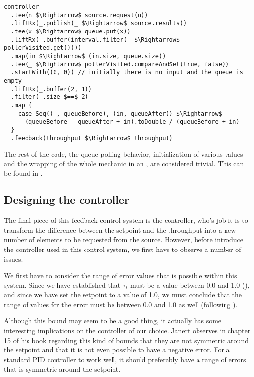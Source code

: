 \begin{minipage}{\linewidth}
\begin{lstlisting}[style=ScalaStyle, caption={Feedback system for controlling the buffer}, label={lst:buffer-feedback-control}]
controller
  .tee(n $\Rightarrow$ source.request(n))
  .liftRx(_.publish(_ $\Rightarrow$ source.results))
  .tee(x $\Rightarrow$ queue.put(x))
  .liftRx(_.buffer(interval.filter(_ $\Rightarrow$ pollerVisited.get())))
  .map(in $\Rightarrow$ (in.size, queue.size))
  .tee(_ $\Rightarrow$ pollerVisited.compareAndSet(true, false))
  .startWith((0, 0)) // initially there is no input and the queue is empty
  .liftRx(_.buffer(2, 1))
  .filter(_.size $==$ 2)
  .map {
    case Seq((_, queueBefore), (in, queueAfter)) $\Rightarrow$
      (queueBefore - queueAfter + in).toDouble / (queueBefore + in)
  }
  .feedback(throughput $\Rightarrow$ throughput)
\end{lstlisting}
\end{minipage}

The rest of the code, the queue polling behavior, initialization of various values and the wrapping of the whole mechanic in an , are considered trivial. This can be found in .

\subsection{Designing the controller}
\label{subsec:controller-design}
The final piece of this feedback control system is the controller, who's job it is to transform the difference between the setpoint and the throughput into a new number of elements to be requested from the source. However, before introduce the controller used in this control system, we first have to observe a number of issues.

We first have to consider the range of error values that is possible within this system. Since we have established that $\tau_t$ must be a value between 0.0 and 1.0 (), and since we have set the setpoint to a value of 1.0, we must conclude that the range of values for the error must be between 0.0 and 1.0 as well (following ). 

Although this bound may seem to be a good thing, it actually has some interesting implications on the controller of our choice. Janert observes in chapter 15 of his book \cite{janert2013-feedback} regarding this kind of bounds that they are not symmetric around the setpoint and that it is not even possible to have a negative error. For a standard PID controller to work well, it should preferably have a range of errors that is symmetric around the setpoint.

